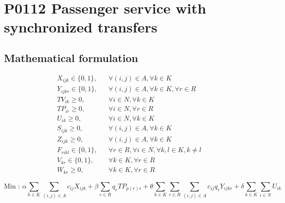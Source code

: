\documentclass[10pt]{article}
\begin{document}
\section*{P0112 Passenger service with synchronized transfers}
\subsection*{Mathematical formulation}
\[
\begin{aligned}
& X_{ijk} \in \{0, 1\}, && \forall (i, j) \in A, \forall k \in K \\
& Y_{ijkr} \in \{0, 1\}, && \forall (i, j) \in A, \forall k \in K, \forall r \in R \\
& TV_{ik} \geq 0, && \forall i \in N, \forall k \in K \\
& TP_{ir} \geq 0, && \forall i \in N, \forall r \in R \\
& U_{ik} \geq 0, && \forall i \in N, \forall k \in K \\
& S_{ijk} \geq 0, && \forall (i, j) \in A, \forall k \in K \\
& Z_{ijk} \geq 0, && \forall (i, j) \in A, \forall k \in K \\
& F_{rikl} \in \{0, 1\}, && \forall r \in R, \forall i \in N, \forall k, l \in K, k \neq l \\
& V_{kr} \in \{0, 1\}, && \forall k \in K, \forall r \in R \\
& W_{kr} \geq 0, && \forall k \in K, \forall r \in R
\end{aligned}
\]

\[
\text{Min : } \alpha \sum_{k \in K} \sum_{(i,j) \in A} c_{ij} X_{ijk} + \beta \sum_{r \in R} q_r TP_{p(r)r} + \theta \sum_{k \in K} \sum_{r \in R} \sum_{(i,j) \in A} c_{ij} q_r Y_{ijkr} + \delta \sum_{k \in K} \sum_{i \in N} U_{ik}
\]
\end{document}
